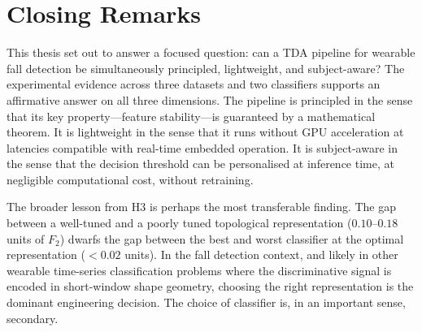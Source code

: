 \section{Closing Remarks}

This thesis set out to answer a focused question: can a TDA pipeline for wearable
fall detection be simultaneously principled, lightweight, and subject-aware?  The
experimental evidence across three datasets and two classifiers supports an
affirmative answer on all three dimensions.  The pipeline is principled in the sense
that its key property---feature stability---is guaranteed by a mathematical theorem.
It is lightweight in the sense that it runs without GPU acceleration at latencies
compatible with real-time embedded operation.  It is subject-aware in the sense that
the decision threshold can be personalised at inference time, at negligible
computational cost, without retraining.

The broader lesson from H3 is perhaps the most transferable finding.  The gap between
a well-tuned and a poorly tuned topological representation ($0.10$--$0.18$ units of
$F_2$) dwarfs the gap between the best and worst classifier at the optimal
representation ($< 0.02$ units).  In the fall detection context, and likely in other
wearable time-series classification problems where the discriminative signal is
encoded in short-window shape geometry, choosing the right representation is the
dominant engineering decision.  The choice of classifier is, in an important sense,
secondary.

